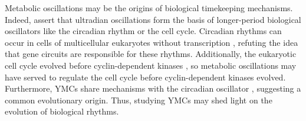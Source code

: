 
Metabolic oscillations may be the origins of biological timekeeping mechanisms.
Indeed, \citet{lloyd_redox_2007} assert that ultradian oscillations form the basis of longer-period biological oscillators like the circadian rhythm or the cell cycle.
Circadian rhythms can occur in cells of multicellular eukaryotes without transcription \citep{oneill_circadian_2011}, refuting the idea that gene circuits are responsible for these rhythms.
Additionally, the eukaryotic cell cycle evolved before cyclin-dependent kinases \citep{papagiannakis_autonomous_2017}, so metabolic oscillations may have served to regulate the cell cycle before cyclin-dependent kinases evolved.
Furthermore, YMCs share mechanisms with the circadian oscillator \citep{causton_metabolic_2015,arata_quantitative_2019}, suggesting a common evolutionary origin.
Thus, studying YMCs may shed light on the evolution of biological rhythms.

